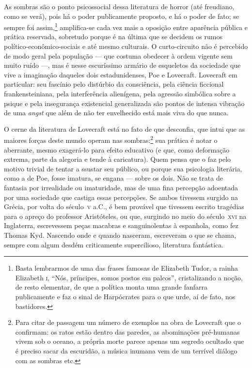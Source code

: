 As sombras são o ponto psicossocial dessa literatura de horror (até
freudiano, como se verá), pois há o poder publicamente proposto, e há o
poder de fato; se sempre foi assim,\footnote{Basta lembrarmos de
  uma das frases famosas de Elizabeth Tudor, a rainha
  Elizabeth \textsc{i}, %
  ``Nós,
  príncipes, somos postos em palcos'', cristalizando a noção, de resto
  elementar, de que a política monta uma grande fanfarra publicamente e
  faz o sinal de Harpócrates para o que urde, aí de fato, nos
  bastidores.} amplifica-se cada vez mais a oposição entre
aparência pública e prática reservada, sobretudo porque é
na última que se decidem os rumos político-econômico-sociais e até mesmo
culturais. O curto-circuito não é percebido de modo geral pela população
--- que costuma obedecer à ordem vigente sem muito ruído ---, mas é
nesse escuríssimo armário de esqueletos da sociedade que vive a
imaginação daqueles dois estadunidenses, Poe e Lovecraft. Lovecraft em
particular: seu fascínio pelo distúrbio da consciência, pela ciência
ficcional frankensteiniana, pela interferência alienígena, pela agressão
simbólica sobre a psique e pela insegurança existencial generalizada são
pontos de intensa vibração de uma \emph{angst} que além de não ter
envelhecido está mais viva do que nunca.

O cerne da literatura de Lovecraft está no fato de que desconfia,
que intui que as maiores forças deste mundo operam nas sombras:\footnote{Para
  citar de passagem um número de exemplos na obra de Lovecraft que o
  confirmam: os ratos estão dentro das paredes, as abominações
  pré-humanas vivem sob o oceano, a própria morte parece apenas um
  segredo ocultado que é preciso sacar da escuridão, a música inumana
  vem de um terrível diálogo com as sombras etc.} sua prática é notar o aberrante, mesmo exagerá-lo para efeito educativo (e que,
como deformação extrema, parte da alegoria e tende à caricatura). Quem
pensa que o faz pelo motivo trivial de tentar a ssustar seu público, ou
porque sua psicologia literária, como a de Poe, fosse imatura, se engana
--- sobre os dois. Não se trata de fantasia por irrealidade ou
imaturidade, mas de uma fina percepção adoentada por uma sociedade que
castiga essas percepções. Se ambos tivessem surgido na Grécia, por volta do
século~\textsc{v} a.C., é bem provável que tivessem escrito tragédias para o
apreço do professor Aristóteles, ou que, surgindo no meio do século~\textsc{xvi}
na Inglaterra, escrevessem peças macabras e sanguinolentas à espanhola,
como fez Thomas Kyd. Nascendo onde e quando nasceram, escreveram o que
se chama, sempre com algum desdém criticamente supercilioso,
literatura fantástica.


